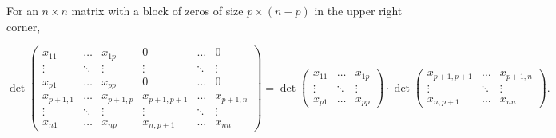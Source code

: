 For an $n \times n$ matrix with a block of zeros of size $p \times (n-p)$ in the upper right corner,

$$\det \begin{pmatrix}
x_{11} & \ldots & x_{1p} & 0 & \ldots & 0 \\
\vdots & \ddots & \vdots & \vdots & \ddots & \vdots \\
x_{p1} & \ldots & x_{pp} & 0 & \ldots & 0 \\
x_{p+1,1} & \ldots & x_{p+1,p} & x_{p+1,p+1} & \ldots & x_{p+1,n} \\
\vdots & \ddots & \vdots & \vdots & \ddots & \vdots \\
x_{n1} & \ldots & x_{np} & x_{n,p+1} & \ldots & x_{nn}
\end{pmatrix} = \det \begin{pmatrix}
x_{11} & \ldots & x_{1p} \\
\vdots & \ddots & \vdots \\
x_{p1} & \ldots & x_{pp}
\end{pmatrix} \cdot \det \begin{pmatrix}
x_{p+1,p+1} & \ldots & x_{p+1,n} \\
\vdots & \ddots & \vdots \\
x_{n,p+1} & \ldots & x_{nn}
\end{pmatrix}.$$
